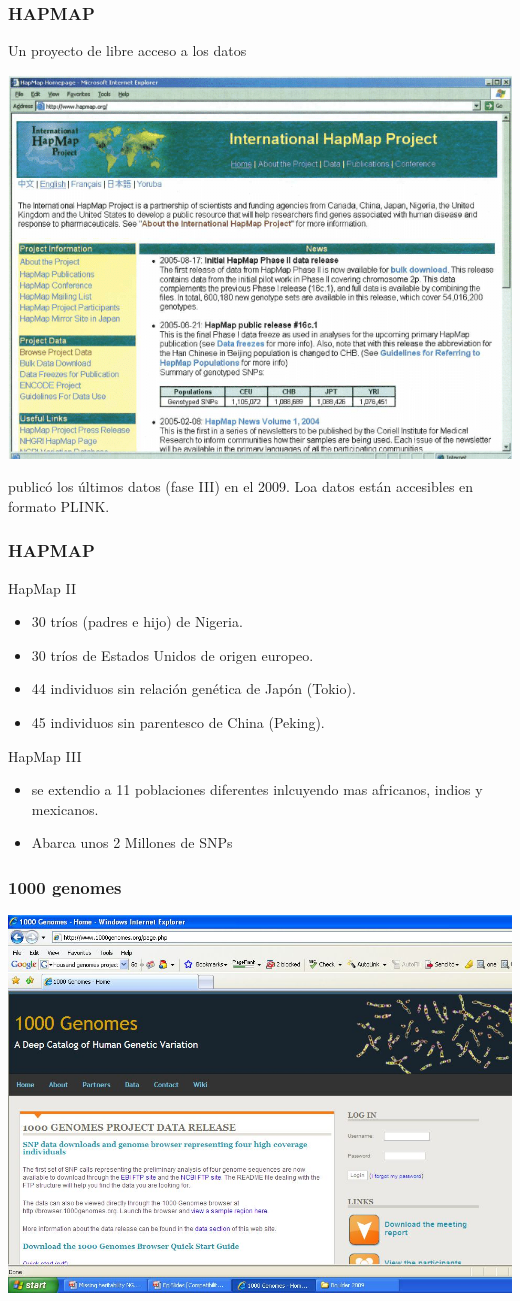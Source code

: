 \documentclass{beamer}\usepackage[]{graphicx}\usepackage[]{color}
\begin{document}
\begin{frame}[fragile]
\frametitle{HAPMAP}
Un proyecto de libre acceso a los datos

\begin{center}
\includegraphics[width=0.5\linewidth]{hapmap.png}
\end{center}

public\'o los \'ultimos datos (fase III) en el 2009.
Loa datos est\'an accesibles en formato PLINK.
\end{frame}




\begin{frame}[fragile]
\frametitle{HAPMAP}
HapMap II
\begin{itemize}
\item     30 tr\'ios (padres e hijo) de Nigeria.
\item     30 tr\'ios de Estados Unidos de origen europeo. 
\item     44 individuos sin relaci\'on gen\'etica de Jap\'on (Tokio).
\item     45 individuos sin parentesco de China (Peking).
\end{itemize}

HapMap III 
\begin{itemize}
\item se extendio a 11 poblaciones diferentes inlcuyendo mas africanos, indios y mexicanos.
\item Abarca unos 2 Millones de SNPs
\end{itemize}

\end{frame}


\begin{frame}[fragile]
\frametitle{1000 genomes}

\begin{center}
\includegraphics[width=0.5\linewidth]{1kG.jpg}
\end{center}
\end{frame}
\end{document}
